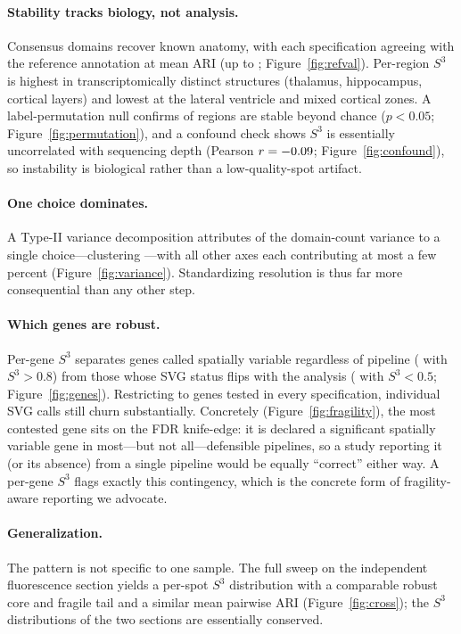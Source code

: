\paragraph{Stability tracks biology, not analysis.} Consensus domains recover known anatomy,
with each specification agreeing with the reference annotation at mean ARI \RefAriMean{} (up
to \RefAriMax{}; Figure~\ref{fig:refval}). Per-region $S^3$ is highest in transcriptomically
distinct structures (thalamus, hippocampus, cortical layers) and lowest at the lateral
ventricle and mixed cortical zones. A label-permutation null confirms \RegionsStable{} of
\NregionsTotal{} regions are stable beyond chance ($p < 0.05$;
Figure~\ref{fig:permutation}), and a confound check shows $S^3$ is essentially uncorrelated
with sequencing depth (Pearson $r = -0.09{}$; Figure~\ref{fig:confound}), so instability
is biological rather than a low-quality-spot artifact.

\paragraph{One choice dominates.} A Type-II variance decomposition attributes \VarTopFrac{} of
the domain-count variance to a single choice---clustering \VarTopAxis{}---with all other axes
each contributing at most a few percent (Figure~\ref{fig:variance}). Standardizing resolution
is thus far more consequential than any other step.

\paragraph{Which genes are robust.} Per-gene $S^3$ separates genes called spatially variable
regardless of pipeline (\GeneRobustFrac{} with $S^3 > 0.8$) from those whose SVG status flips
with the analysis (\GeneFragileFrac{} with $S^3 < 0.5$; Figure~\ref{fig:genes}). Restricting
to genes tested in every specification, individual SVG calls still churn substantially.
Concretely (Figure~\ref{fig:fragility}), the most contested gene sits on the FDR knife-edge:
it is declared a significant spatially variable gene in most---but not all---defensible
pipelines, so a study reporting it (or its absence) from a single pipeline would be equally
``correct'' either way. A per-gene $S^3$ flags exactly this contingency, which is the concrete
form of fragility-aware reporting we advocate.

\paragraph{Generalization.} The pattern is not specific to one sample. The full sweep on the
independent fluorescence section yields a per-spot $S^3$ distribution with a comparable robust
core and fragile tail and a similar mean pairwise ARI (Figure~\ref{fig:cross}); the $S^3$
distributions of the two sections are essentially conserved.

